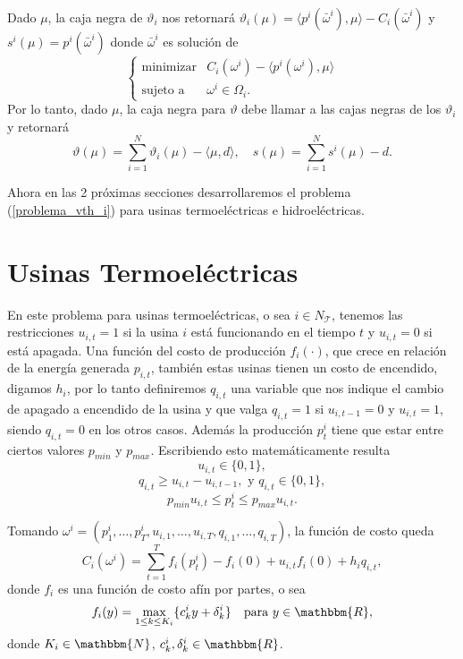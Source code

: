 \documentclass[a4paper,12pt]{report}
\newcommand{\la}{\langle}
\newcommand{\ra}{\rangle}
\newcommand{\RR}{\mathbbm{R}}
\newcommand{\vth}{\vartheta}
\newcommand{\om}{\omega}
\newcommand{\cT}{\mathcal{T}}
\begin{document}
Dado $\mu$, la caja negra de $\vth_i$ nos retornar\'a $\vth_i(\mu)=\la p^i(\bar\om^i),\mu\ra-C_i(\bar\om^i)$ y \linebreak $s^i(\mu)=p^i(\bar\om^i)$ donde $\bar\om^i$ es soluci\'on de 
\begin{equation}\label{problema_vth_i}
\left\{
 \begin{array}{rl}
\mathop\mathrm{minimizar} & C_i(\om^i)-\la p^i(\om^i),\mu\ra\\
  \mbox{sujeto a}& \omega^i\in\Omega_i.
 \end{array}
\right.
\end{equation}
Por lo tanto, dado $\mu$, la caja negra para $\vth$ debe llamar a las cajas negras de los $\vth_i$ y retornar\'a
$$\vth(\mu)=\sum_{i=1}^{N}\vth_i(\mu)-\la \mu,d\ra,\quad s(\mu)=\sum_{i=1}^{N}s^i(\mu)-d.$$

Ahora en las 2 pr\'oximas secciones desarrollaremos el problema (\ref{problema_vth_i}) para usinas termoel\'ectricas e hidroel\'ectricas.

\section{Usinas Termoel\'ectricas}\label{sec:termo}

En este problema para usinas termoel\'ectricas, o sea $i\in N_\cT$, tenemos las restricciones $u_{i,t}=1$ si la usina $i$ est\'a funcionando en el tiempo $t$ y $u_{i,t}=0$ si est\'a apagada. Una funci\'on del costo de producci\'on $f_i(\cdot)$, que crece en relaci\'on de la energ\'ia generada $p_{i,t}$, tambi\'en estas usinas tienen un costo de encendido, digamos $h_i$, por lo tanto definiremos $q_{i,t}$ una variable que nos indique el cambio de apagado a encendido de la usina y que valga $q_{i,t}=1$ si $u_{i,t-1}=0$ y $u_{i,t}=1$, siendo $q_{i,t}=0$ en los otros casos. Adem\'as la producci\'on $p_{t}^i$ tiene que estar entre ciertos valores $p_{min}$ y $p_{max}$.
Escribiendo esto matem\'aticamente resulta
\begin{equation}\label{rt1}
u_{i,t}\in\{0,1\},
\end{equation}
\begin{equation}\label{rt2}
q_{i,t}\geq u_{i,t}-u_{i,t-1},\mbox{ y } q_{i,t}\in\{0,1\},
\end{equation}
\begin{equation}\label{rt3}
p_{min}u_{i,t}\leq p_{t}^i\leq p_{max}u_{i,t}.
\end{equation}

Tomando $\om^i=(p_1^i,\ldots,p_T^i,u_{i,1},\ldots,u_{i,T},q_{i,1},\ldots,q_{i,T})$, la funci\'on de costo queda
\begin{equation}\label{costot}
C_i(\om^i)=\sum_{t=1}^{T} f_i(p_{t}^i)-f_i(0)+u_{i,t}f_i(0)+h_i q_{i,t},
\end{equation}
donde $f_i$ es una funci\'on de costo af\'in por partes, o sea
$$f_i(y)=\max_{1\leq k\leq K_i}\{c_k^i y+\delta_k^i\}\quad\mbox{para } y\in\RR,$$
donde $K_i\in\mathbbm{N}$, $c_k^i, \delta_k^i\in\RR$.
\end{document}
